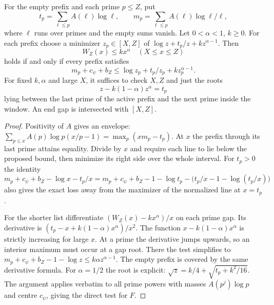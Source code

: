 \begin{proposition}\label{pref:test}
For the empty prefix and each prime \(p\le Z\), put
\[
 t_p=\sum_{\ell\le p}A(\ell)\log\ell,\qquad
 m_p=\sum_{\ell\le p}A(\ell)\log\ell/\ell ,
\]
where \(\ell\) runs over primes and the empty sums vanish.
Let \(0<\alpha<1\), \(k\ge0\). For each prefix choose a minimizer
\(z_p\in[X,Z]\) of \(\log z+t_p/z+kz^{\alpha-1}\). Then
\[
 W_Z(x)\le k x^\alpha\quad(X\le x\le Z)
\]
holds if and only if every prefix satisfies
\[
       m_p+c_\psi+b_Z\le\log z_p+t_p/z_p+kz_p^{\alpha-1}.
\]
For fixed \(k,\alpha\) and large \(X\), it suffices to check \(X,Z\)
and just the roots
\[
 z-k(1-\alpha)z^\alpha=t_p
\]
lying between the last prime of the active prefix and the next prime
inside the window. An end gap is intersected with \([X,Z]\).
\end{proposition}
\begin{proof}
Positivity of \(A\) gives an envelope:
\(\sum_{p\le x}A(p)\log p(x/p-1)=\max_p(xm_p-t_p)\).
At \(x\) the prefix through its last prime attains equality. Divide by
\(x\) and require each line to lie below the proposed bound, then
minimize its right side over the whole interval. For \(t_p>0\) the
identity
\[
 m_p+c_\psi+b_Z-\log x-t_p/x
 =m_p+c_\psi+b_Z-1-\log t_p
                  -\bigl(t_p/x-1-\log(t_p/x)\bigr)
\]
also gives the exact loss away from the maximizer of the normalized
line at \(x=t_p\).

For the shorter list differentiate \((W_Z(x)-kx^\alpha)/x\) on
each prime gap. Its derivative is
\((t_p-x+k(1-\alpha)x^\alpha)/x^2\).
The function \(x-k(1-\alpha)x^\alpha\) is strictly increasing for
large \(x\). At a prime the derivative jumps upwards, so an interior
maximum must occur at a gap root. There the test simplifies to
\(m_p+c_\psi+b_Z-1-\log z\le k\alpha z^{\alpha-1}\).
The empty prefix is covered by the same derivative formula.
For \(\alpha=1/2\) the root is explicit:
\(\sqrt z=k/4+\sqrt{t_p+k^2/16}\).
The argument applies verbatim to all prime powers with masses
\(A(p^j)\log p\) and centre \(c_\psi\), giving the direct test for \(F\).
\end{proof}

